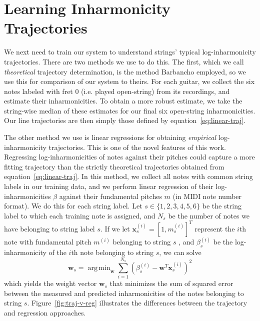 \documentclass[12pt]{cmuthesis}
\DeclareMathOperator*{\argmin}{arg\,min}
\begin{document}
\section{Learning Inharmonicity Trajectories}
We next need to train our system to understand strings' typical log-inharmonicity trajectories. There are two methods we use to do this. The first, which we call \textit{theoretical} trajectory determination, is the method Barbancho employed, so we use this for comparison of our system to theirs. For each guitar, we collect the six notes labeled with fret 0 (i.e. played open-string) from its recordings, and estimate their inharmonicities. To obtain a more robust estimate, we take the string-wise median of these estimates for our final six open-string inharmonicities. Our line trajectories are then simply those defined by equation~\eqref{eq:linear-traj}. 


The other method we use is linear regressions for obtaining \textit{empirical} log-inharmonicity trajectories. This is one of the novel features of this work. Regressing log-inharmonicities of notes against their pitches could capture a more fitting trajectory than the strictly theoretical trajectories obtained from equation~\eqref{eq:linear-traj}. In this method, we collect all notes with common string labels in our training data, and we perform linear regression of their log-inharmonicities $\beta$ against their fundamental pitches $m$ (in MIDI note number format). We do this for each string label. Let $s \in \{1,2,3,4,5,6\}$ be the string label to which each training note is assigned, and $N_s$ be the number of notes we have belonging to string label $s$. If we let $\mathbf{x}_s^{(i)} = [1, m_s^{(i)}]^T$ represent the $i$th note with fundamental pitch $m^{(i)}$ belonging to string $s$ , and $\beta_s^{(i)}$ be the log-inharmonicity of the $i$th note belonging to string $s$, we can solve
\begin{equation}
\label{lin-reg}
\mathbf{w}_s = \argmin_{\mathbf{w}}{\sum_{i=1}^{N_s}{(\beta^{(i)}_s - \mathbf{w}^T\mathbf{x}^{(i)}_s)^2}}
\end{equation}
which yields the weight vector $\mathbf{w}_s$ that minimizes the sum of squared error between the measured and predicted inharmonicities of the notes belonging to string $s$. Figure~\ref{fig:traj-v-reg} illustrates the differences between the trajectory and regression approaches.
\end{document}
